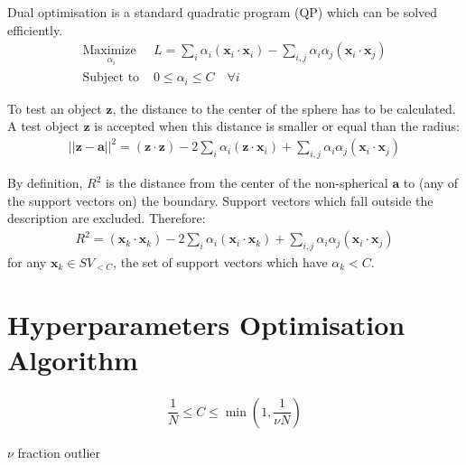 \documentclass[3p,times]{elsarticle}
\begin{document}
Dual optimisation is a standard quadratic program (QP) which can be solved efficiently.
\begin{subequations}\label{eq:svdd_dual}
\begin{align}
\underset{
	\begin{array}{c}
		 \alpha_i
	\end{array}}{\text{Maximize }} & L = \sum_i \alpha_i \left( \mathbf{x}_i \cdot \mathbf{x}_i \right) - \sum_{i,j} \alpha_i \alpha_j \left( \mathbf{x}_i \cdot \mathbf{x}_j \right)\\
\text{Subject to } & 0 \le \alpha_i \le C \quad \forall i
\end{align}
\end{subequations}

To test an object $\mathbf{z}$, the distance to the center of the sphere has to be calculated. A test
object $\mathbf{z}$ is accepted when this distance is smaller or equal than the radius:
\begin{align}
\left|\left| \mathbf{z} - \mathbf{a} \right|\right|^2 = \left( \mathbf{z} \cdot \mathbf{z} \right) - 2 \sum_i \alpha_i \left( \mathbf{z} \cdot \mathbf{x}_i \right) + \sum_{i,j} \alpha_i \alpha_j \left( \mathbf{x}_i \cdot \mathbf{x}_j \right)
\end{align}

By definition, $R^2$ is the distance from the center of the non-spherical $\mathbf{a}$ to (any of the support vectors on) the boundary. Support vectors which fall outside the description are excluded. Therefore:
\begin{align}
R^2 = \left( \mathbf{x}_k \cdot \mathbf{x}_k \right) - 2 \sum_i \alpha_i \left( \mathbf{x}_i \cdot \mathbf{x}_k \right) + \sum_{i,j} \alpha_i \alpha_j \left( \mathbf{x}_i \cdot \mathbf{x}_j \right)
\end{align}
for any $\mathbf{x}_k \in SV_{<C}$, the set of support vectors which have $\alpha_k < C$.

\section{Hyperparameters Optimisation Algorithm}

\cite{scholkopf2001estimating}

\cite{Xiao2015}

\begin{align}
\dfrac{1}{N} \le C \le \min \left( 1, \dfrac{1}{\nu N} \right)
\end{align}

$\nu$ fraction outlier
\end{document}
